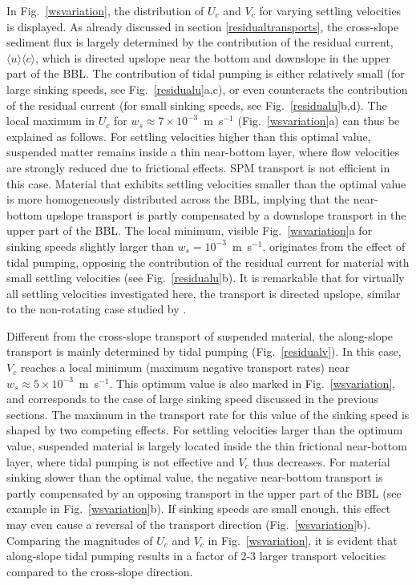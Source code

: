 In Fig.\ \ref{wsvariation}, the distribution of $U_c$ and $V_c$ for
varying settling velocities is displayed.  As already discussed in
section \ref{residualtransports}, the cross-slope sediment flux is
largely determined by the contribution of the residual current,
$\langle u \rangle \langle c \rangle$, which is directed upslope near
the bottom and downslope in the upper part of the BBL. The
contribution of tidal pumping is either relatively small (for large
sinking speeds, see Fig.\ \ref{residualu}a,c), or even counteracts the
contribution of the residual current (for small sinking speeds, see
Fig.\ \ref{residualu}b,d). The local maximum in $U_c$ for $w_s \approx
7 \times 10^{-3}$~m~s$^{-1}$ (Fig.\ \ref{wsvariation}a) can thus be
explained as follows. For settling velocities higher than this optimal
value, suspended matter remains inside a thin near-bottom layer, where
flow velocities are strongly reduced due to frictional effects. SPM
transport is not efficient in this case. Material that exhibits
settling velocities smaller than the optimal value is more
homogeneously distributed across the BBL, implying that the
near-bottom upslope transport is partly compensated by a downslope
transport in the upper part of the BBL.  The local minimum, visible
Fig.\ \ref{wsvariation}a for sinking speeds slightly larger than
$w_s=10^{-3}$~m~s$^{-1}$, originates from the effect of tidal pumping,
opposing the contribution of the residual current for material with
small settling velocities (see Fig.\ \ref{residualu}b). It is
remarkable that for virtually all settling velocities investigated
here, the transport is directed upslope, similar to the non-rotating
case studied by \cite{schulzumlauf2016}.

Different from the cross-slope transport of suspended material, the
along-slope transport is mainly determined by tidal pumping
(Fig.\ \ref{residualv}). In this case, $V_c$ reaches a local minimum
(maximum negative transport rates) near $w_s \approx 5 \times
10^{-3}$~m~s$^{-1}$. This optimum value is also marked in
Fig.\ \ref{wsvariation}, and corresponds to the case of large sinking
speed discussed in the previous sections. The maximum in the transport
rate for this value of the sinking speed is shaped by two competing
effects. For settling velocities larger than the optimum value,
suspended material is largely located inside the thin frictional
near-bottom layer, where tidal pumping is not effective and $V_c$ thus
decreases. For material sinking slower than the optimal value, the
negative near-bottom transport is partly compensated by an opposing
transport in the upper part of the BBL (see example in
Fig.\ \ref{wsvariation}b). If sinking speeds are small enough, this
effect may even cause a reversal of the transport direction
(Fig.\ \ref{wsvariation}b). Comparing the magnitudes of $U_c$ and
$V_c$ in Fig.\ \ref{wsvariation}, it is evident that along-slope tidal
pumping results in a factor of 2-3 larger transport velocities
compared to the cross-slope direction.

